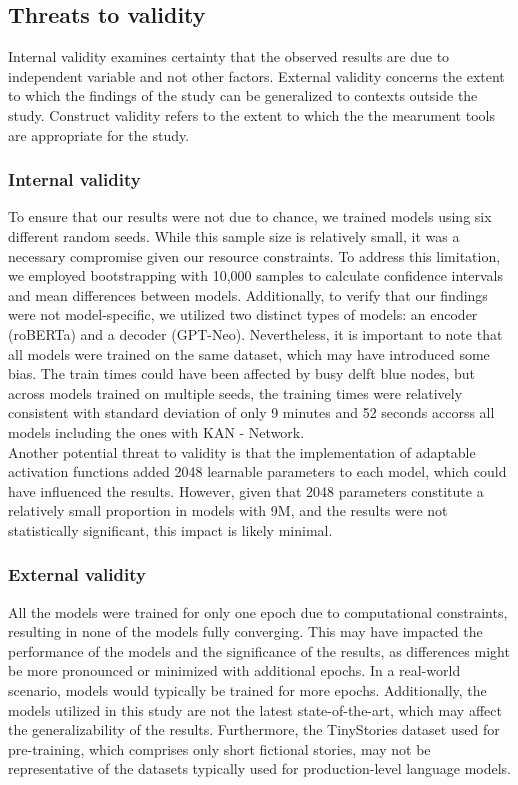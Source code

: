 \subsection{Threats to validity}
Internal validity examines certainty that the observed results are due to independent variable and not other factors. External validity concerns the extent to which the findings of the study can be generalized to contexts outside the study. Construct validity refers to the extent to which the the mearument tools are appropriate for the study. 

\subsubsection{Internal validity}
To ensure that our results were not due to chance, we trained models using six different random seeds. While this sample size is relatively small, it was a necessary compromise given our resource constraints. To address this limitation, we employed bootstrapping with 10,000 samples to calculate confidence intervals and mean differences between models. Additionally, to verify that our findings were not model-specific, we utilized two distinct types of models: an encoder (roBERTa) and a decoder (GPT-Neo). Nevertheless, it is important to note that all models were trained on the same dataset, which may have introduced some bias. The train times could have been affected by busy delft blue nodes, but across models trained on multiple seeds, the training times were relatively consistent with standard deviation of only 9 minutes and 52 seconds accorss all models including the ones with KAN - Network. \\ 
Another potential threat to validity is that the implementation of adaptable activation functions added 2048 learnable parameters to each model, which could have influenced the results. However, given that 2048 parameters constitute a relatively small proportion in models with 9M, and the results were not statistically significant, this impact is likely minimal.

\subsubsection{External validity}
All the models were trained for only one epoch due to computational constraints, resulting in none of the models fully converging. This may have impacted the performance of the models and the significance of the results, as differences might be more pronounced or minimized with additional epochs. In a real-world scenario, models would typically be trained for more epochs. Additionally, the models utilized in this study are not the latest state-of-the-art, which may affect the generalizability of the results. Furthermore, the TinyStories dataset used for pre-training, which comprises only short fictional stories, may not be representative of the datasets typically used for production-level language models.

